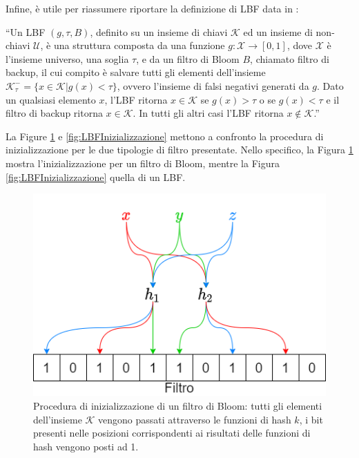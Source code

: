 \documentclass[../../main.tex]{subfiles}
\begin{document}
    Infine, è utile per riassumere riportare la definizione di LBF data in \cite{10.5555/3326943.3326986}: 

    ``Un LBF $(g, \tau, B)$, definito su un insieme di chiavi $\mathcal{K}$ ed un insieme di non-chiavi $\mathcal{U}$, è una struttura composta da una funzione $g : \mathcal{X} \rightarrow [0,1]$, dove $\mathcal{X}$ è l'insieme universo, una soglia $\tau$, e da un filtro di Bloom $B$, chiamato filtro di backup, il cui compito è salvare tutti gli elementi dell'insieme $\mathcal{K}_{\tau}^- = \{x \in \mathcal{K} | g(x) < \tau\}$, ovvero l'insieme di falsi negativi generati da $g$. Dato un qualsiasi elemento $x$, l'LBF ritorna $x \in \mathcal{K}$ se $g(x) > \tau$ o se $g(x) < \tau$ e il filtro di backup ritorna $x \in \mathcal{K}$. In tutti gli altri casi l'LBF ritorna $x\notin \mathcal{K}$.''

    La Figure \ref{fig:BFInizializzazione} e \ref{fig:LBFInizializzazione} mettono a confronto la procedura di inizializzazione per le due tipologie di filtro presentate. Nello specifico, la Figura \ref{fig:BFInizializzazione} mostra l'inizializzazione per un filtro di Bloom, mentre la Figura \ref{fig:LBFInizializzazione} quella di un LBF.

    \begin{figure}[H]
        \centering
        \includegraphics[width=\textwidth]{immagini/5_1/BFInizializzazione.png}
        \caption{Procedura di inizializzazione di un filtro di Bloom: tutti gli elementi dell'insieme $\mathcal{K}$ vengono passati attraverso le funzioni di hash $k$, i bit presenti nelle posizioni corrispondenti ai risultati delle funzioni di hash vengono posti ad 1.}
        \label{fig:BFInizializzazione}
    \end{figure}
\end{document}
